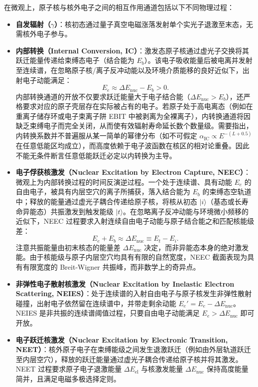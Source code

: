 在微观上，原子核与核外电子之间的相互作用通道包括以下不同物理过程：
\begin{itemize}
\item \textbf{自发辐射（$\gamma$）}：核初态通过量子真空电磁涨落发射单个实光子退激至末态，无需核外电子参与。
\item \textbf{内部转换（Internal Conversion, IC）}：激发态原子核通过虚光子交换将其跃迁能量传递给束缚态电子（结合能为 $E_b$）。该电子吸收能量后被电离并发射至连续谱，在忽略原子核/离子反冲动能以及环境介质能移的良好近似下，出射电子动能满足：
\begin{equation}\label{eq:4-8-ic-energy-cons}
E_e \approx \Delta E_{\mathrm{nuc}} - E_b > 0.
\end{equation}
内部转换通道的开放不仅要求跃迁能量大于电子结合能（$\Delta E_{\mathrm{nuc}} > E_b$），还严格要求对应的原子壳层存在实际被占有的电子。若原子处于高电离态（例如在重离子储存环或电子束离子阱 EBIT 中被剥离为全裸离子），内转换通道将因缺乏束缚电子而完全关闭，从而使有效辐射寿命延长数个数量级。需要指出，内转换系数并不普遍服从某一简单的幂律分布（如不可假定 $\alpha_{\mathrm{IC}} \propto E^{-(L+0.5)}$ 在任意低能区均成立），而高度依赖于电子波函数在核区的相对论重叠。因此不能无条件断言任意低能跃迁必定以内转换为主导。
\item \textbf{电子俘获核激发（Nuclear Excitation by Electron Capture, NEEC）}：微观上为内部转换过程的时间反演逆过程。一个处于连续谱、具有动能 $E_e$ 的自由电子，被具有内层空穴的离子所捕获，落入结合能为 $E_b$ 的束缚态空轨道中；释放的能量通过虚光子耦合传递给原子核，将核从初态 $|i\rangle$（基态或长寿命异能态）共振激发到触发能级 $|t\rangle$。在忽略离子反冲动能与环境微小频移的近似下，NEEC 过程要求入射连续自由电子动能与原子结合能之和匹配核能级差：
\begin{equation}\label{eq:4-8-neec-resonance-cond}
E_e + E_b \approx \Delta E_{\mathrm{nuc}} \equiv E_t - E_i.
\end{equation}
注意共振能量由初末核态的能量差 $\Delta E_{\mathrm{nuc}}$ 决定，而非异能态本身的绝对激发能。由于核能级与原子内层空穴均具有有限的自然宽度，NEEC 截面表现为具有有限宽度的 Breit-Wigner 共振峰，而非数学上的奇异点。
\item \textbf{非弹性电子散射核激发（Nuclear Excitation by Inelastic Electron Scattering, NEIES）}：处于连续谱的入射自由电子与原子核发生非弹性散射碰撞，出射电子依然留在连续谱中，并带走剩余动能 $E_e' = E_e - \Delta E_{\mathrm{nuc}}$。NEIES 是非共振的连续谱阈值过程，只要自由电子动能满足 $E_e > \Delta E_{\mathrm{nuc}}$ 即可开放。
\item \textbf{电子跃迁核激发（Nuclear Excitation by Electronic Transition, NEET）}：核外原子电子在束缚能级之间发生退激跃迁（例如由外层轨道跃迁至内层空穴），释放的跃迁能量通过虚光子耦合传递给原子核并将其激发。NEET 过程要求原子电子退激能量 $\Delta E_{\mathrm{el}}$ 与核激发能量 $\Delta E_{\mathrm{nuc}}$ 保持高度能量简并，且满足电磁多极选择定则。
\end{itemize}

